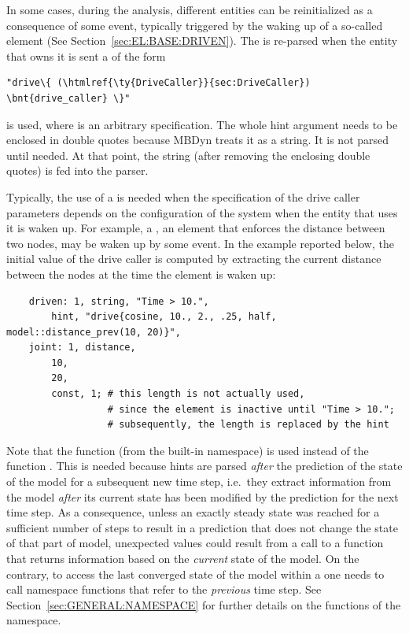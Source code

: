 In some cases, during the analysis, different entities can be reinitialized
as a consequence of some event, typically triggered by the waking up 
of a so-called  element (See Section~\ref{sec:EL:BASE:DRIVEN}).
The  is re-parsed when the entity that owns it is sent
a  of the form
\begin{Verbatim}[commandchars=\\\{\}]
    "drive\{ (\htmlref{\ty{DriveCaller}}{sec:DriveCaller}) \bnt{drive_caller} \}"
\end{Verbatim}
is used, where  is an arbitrary 
specification.
The whole hint argument needs to be enclosed in double quotes because MBDyn
treats it as a string.
It is not parsed until needed.
At that point, the string (after removing the enclosing double quotes)
is fed into the parser.

Typically, the use of a  is needed when the specification of the
drive caller parameters depends on the configuration of the system when the
entity that uses it is waken up.
For example, a , an element that enforces the distance
between two nodes, may be waken up by some event.
In the example reported below, the initial value of the  drive caller
is computed by extracting the current distance between the nodes at the time
the element is waken up:
\begin{verbatim}
    driven: 1, string, "Time > 10.",
        hint, "drive{cosine, 10., 2., .25, half, model::distance_prev(10, 20)}",
    joint: 1, distance,
        10,
        20,
        const, 1; # this length is not actually used,
                  # since the element is inactive until "Time > 10.";
                  # subsequently, the length is replaced by the hint
\end{verbatim}
Note that the function 
(from the built-in  namespace)
is used instead of the function .
This is needed because hints are parsed \emph{after} the prediction
of the state of the model for a subsequent new time step,
i.e.\ they extract information from the model
\emph{after} its current state has been modified by the prediction
for the next time step.
As a consequence, unless an exactly steady state was reached
for a sufficient number of steps to result in a prediction
that does not change the state of that part of model,
unexpected values could result from a call to a function that returns
information based on the \emph{current} state of the model.
On the contrary, to access the last converged state of the model
within a  one needs to call  namespace functions
that refer to the \emph{previous} time step.
See Section~\ref{sec:GENERAL:NAMESPACE} for further details
on the functions of the  namespace.



